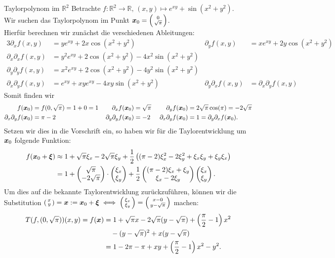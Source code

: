 \begin{Beispiel}
{Taylorpolynom im $\mathbb{R}^2$}
Betrachte $f:\mathbb{R}^2\to\mathbb{R},\,(x,y)\mapsto e^{xy}+\sin(x^2+y^2)$.\\
Wir suchen das Taylorpolynom im Punkt ${{\text{\boldmath${x}$}}}_0=\left(\begin{smallmatrix}0\\\sqrt{\pi}\end{smallmatrix}\right)$.\\
Hierfür berechnen wir zunächst die verschiedenen Ableitungen:
\begin{alignat*}{3}
\partial_xf(x,y)&=ye^{xy}+2x\cos(x^2+y^2)\quad&\partial_yf(x,y)&=xe^{xy}+2y\cos(x^2+y^2)\\
\partial_x\partial_xf(x,y)&=y^2e^{xy}+2\cos(x^2+y^2)-4x^2\sin(x^2+y^2)&&\\ 
\partial_y\partial_yf(x,y)&=x^2e^{xy}+2\cos(x^2+y^2)-4y^2\sin(x^2+y^2)&&\\
\partial_x\partial_yf(x,y)&=e^{xy}+xye^{xy}-4xy\sin(x^2+y^2)&\partial_y\partial_xf(x,y)&=\partial_x\partial_yf(x,y)
\end{alignat*}
Somit finden wir
\begin{alignat*}{5}
f({{\text{\boldmath${x}$}}}_0)&=f(0,\sqrt{\pi})=1+0=1\,&\partial_xf({{\text{\boldmath${x}$}}}_0)&=\sqrt{\pi}&\partial_yf({{\text{\boldmath${x}$}}}_0)&=2\sqrt{\pi}\cos(\pi)=-2\sqrt{\pi}\\
\partial_x\partial_yf({{\text{\boldmath${x}$}}}_0)&=\pi-2&\partial_y\partial_yf({{\text{\boldmath${x}$}}}_0)&=-2&\,\,\partial_x\partial_yf({{\text{\boldmath${x}$}}}_0)&=1=\partial_y\partial_xf({{\text{\boldmath${x}$}}}_0).
\end{alignat*}
Setzen wir dies in die Vorschrift ein, so haben wir für die Taylorentwicklung um ${{\text{\boldmath${x}$}}}_0$ folgende Funktion:
\begin{align*}
    f({{\text{\boldmath${x}$}}}_0+{{\text{\boldmath${\xi}$}}})&\approx1+\sqrt{\pi}\xi_x-2\sqrt{\pi}\xi_y+\frac{1}{2}\left({(\pi-2)\xi_x^2-2\xi_y^2+\xi_x\xi_y+\xi_y\xi_x}\right)\\
    &=1+\begin{pmatrix}\sqrt{\pi}\\-2\sqrt{\pi}\end{pmatrix}\cdot\begin{pmatrix}\xi_x\\\xi_y\end{pmatrix}+\frac{1}{2}\begin{pmatrix}(\pi-2)\xi_x+\xi_y\\\xi_x-2\xi_y\end{pmatrix}\begin{pmatrix}\xi_x\\\xi_y\end{pmatrix}.
\end{align*}
Um dies auf die bekannte Taylorentwicklung zurückzuführen, können wir die Substitution $\left(\begin{smallmatrix}x\\y\end{smallmatrix}\right)={{\text{\boldmath${x}$}}}:={{\text{\boldmath${x}$}}}_0+{{\text{\boldmath${\xi}$}}}\iff \left(\begin{smallmatrix}\xi_x\\\xi_y\end{smallmatrix}\right)=\left(\begin{smallmatrix}x-0\\y-\sqrt{\pi}\end{smallmatrix}\right)$ machen:
\begin{align*}
    T(f,(0,\sqrt{\pi}))(x,y)=f({{\text{\boldmath${x}$}}})&=1+\sqrt{\pi}x-2\sqrt{\pi}(y-\sqrt{\pi})+\left({\frac{\pi}{2}-1}\right)x^2\\
    &\quad-(y-\sqrt{\pi})^2+x(y-\sqrt{\pi})\\
    &=1-2\pi-\pi+xy+\left({\frac{\pi}{2}-1}\right)x^2-y^2.
\end{align*}
\end{Beispiel}

